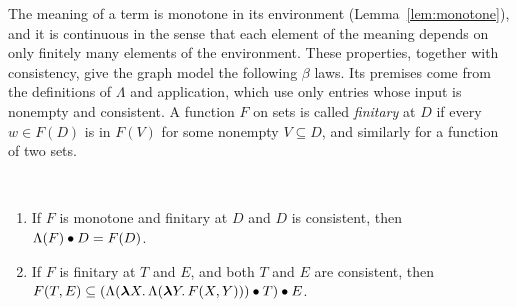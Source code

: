 The meaning of a term is monotone in its environment
(Lemma~\ref{lem:monotone}), and it is continuous in the sense that
each element of the meaning depends on only finitely many elements of
the environment. These properties, together with consistency, give the
graph model the following $\beta$ laws. Its premises come from the
definitions of $\Lambda$ and application, which use only entries whose
input is nonempty and consistent.
%
A function $F$ on sets is called \emph{finitary} at $D$ if every $w
\in F(D)$ is in $F(V)$ for some nonempty $V \subseteq D$, and
similarly for a function of two sets.


\begin{lemma}\label{lem:beta}\ 
\begin{enumerate}
\item If $F$ is monotone and finitary at $D$ and $D$ is consistent,
  then \\
  $\Lambda(F) \mathbin{\bullet} D = F(D)$.
\item If $F$ is finitary at $T$ and $E$, and both $T$ and $E$ are consistent,
  then \\
  $F(T, E) \subseteq (\Lambda(\boldsymbol{\lambda} X.\, \Lambda(\boldsymbol{\lambda} Y.\, F(X, Y))) \mathbin{\bullet} T) \mathbin{\bullet} E$.
\end{enumerate}
\end{lemma}
